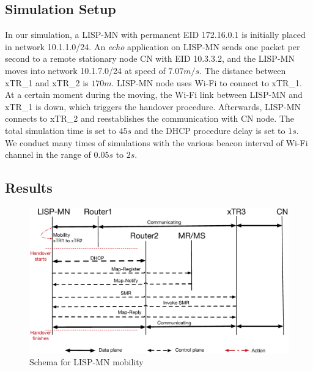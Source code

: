 \subsection{Simulation Setup}
\label{subsec:ns3_setup_lispmn}
In our simulation, a LISP-MN with permanent EID 172.16.0.1 is initially placed in network 10.1.1.0/24. An \emph{echo} application on LISP-MN sends one packet per second to a remote stationary node CN with EID 10.3.3.2, and the LISP-MN moves into network 10.1.7.0/24 at speed of $7.07m/s$. The distance between xTR\_1 and xTR\_2 is $170m$. LISP-MN node uses Wi-Fi to connect to xTR\_1. At a certain moment during the moving, the Wi-Fi link between LISP-MN and xTR\_1 is down, which triggers the handover procedure. Afterwards, LISP-MN connects to xTR\_2 and reestablishes the communication with CN node. The total simulation time is set to $45s$ and the DHCP procedure delay is set to $1s$. We conduct many times of simulations with the various beacon interval of Wi-Fi channel in the range of $0.05s$ to $2s$.

\subsection{Results}
\label{sec:ns3_results_lispmn}

\begin{figure}[!th]
	\centering
	\includegraphics[width=\textwidth]{Pics/Mobility_LISPMN_schema_SMR_simplify}
	\caption{Schema for LISP-MN mobility}
	\label{sim_schema}
\end{figure}

